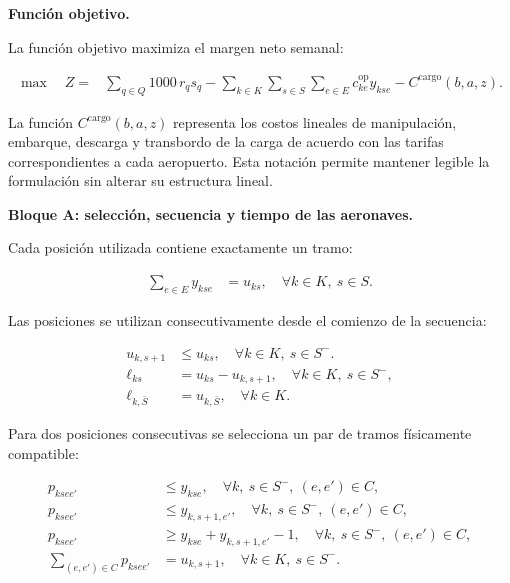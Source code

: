 
\vspace{0.5em}
\noindent\textbf{Función objetivo.}

La función objetivo maximiza el margen neto semanal:

\begin{align}
\max \quad Z
={}&
\sum_{q\in Q}1000\,r_qs_q
-
\sum_{k\in K}\sum_{s\in S}\sum_{e\in E}
c_{ke}^{\mathrm{op}}y_{kse}
-
C^{\mathrm{cargo}}(b,a,z).
\tag{FO}
\label{eq:fo}
\end{align}

La función $C^{\mathrm{cargo}}(b,a,z)$ representa los costos lineales de manipulación,
embarque, descarga y transbordo de la carga de acuerdo con las tarifas correspondientes a
cada aeropuerto. Esta notación permite mantener legible la formulación sin alterar su
estructura lineal.



\vspace{0.5em}
\noindent\textbf{Bloque A: selección, secuencia y tiempo de las aeronaves.}

Cada posición utilizada contiene exactamente un tramo:

\begin{align}
\sum_{e\in E}y_{kse}
&=
u_{ks},
\quad
\forall k\in K,\ s\in S.
\tag{R1}
\label{eq:r1}
\end{align}

Las posiciones se utilizan consecutivamente desde el comienzo de la secuencia:

\begin{align}
u_{k,s+1}
&\leq
u_{ks},
\quad
\forall k\in K,\ s\in S^-.
\tag{R2a}
\label{eq:r2a}
\\
\ell_{ks}
&=
u_{ks}-u_{k,s+1},
\quad
\forall k\in K,\ s\in S^-,
\tag{R2b}
\label{eq:r2b}
\\
\ell_{k,\bar S}
&=
u_{k,\bar S},
\quad
\forall k\in K.
\tag{R2c}
\label{eq:r2c}
\end{align}

Para dos posiciones consecutivas se selecciona un par de tramos físicamente compatible:

\begin{align}
p_{ksee'}
&\leq y_{kse},
\quad
\forall k,\ s\in S^-,\ (e,e')\in C,
\tag{R3a}
\label{eq:r3a}
\\
p_{ksee'}
&\leq y_{k,s+1,e'},
\quad
\forall k,\ s\in S^-,\ (e,e')\in C,
\tag{R3b}
\label{eq:r3b}
\\
p_{ksee'}
&\geq
y_{kse}+y_{k,s+1,e'}-1,
\quad
\forall k,\ s\in S^-,\ (e,e')\in C,
\tag{R3c}
\label{eq:r3c}
\\
\sum_{(e,e')\in C}p_{ksee'}
&=
u_{k,s+1},
\quad
\forall k\in K,\ s\in S^-.
\tag{R3d}
\label{eq:r3d}
\end{align}

